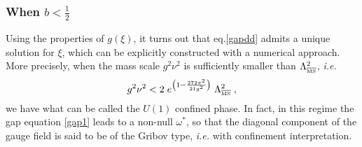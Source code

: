 \subsubsection{When $b<\frac{1}{2}$}
Using the properties of $g(\xi)$, it turns out that eq.\eqref{gapdd} admits a unique solution for $\xi$, which can be explicitly constructed with a numerical approach. More precisely, when the mass scale $g^2\nu^2$ is sufficiently smaller  than $\Lambda_{\overline{\mbox{\tiny{MS}}}}^2$, {\it i.e.}
\begin{equation}
g^2 \nu^2 < 2 \; e^{\left( 1 -\frac{272 \pi^2}{21 g^2} \right)} \; \Lambda_{\overline{\mbox{\tiny{MS}}}}^2   \;, \label{mh1}
\end{equation}
we have what can be called the $U(1)$ confined phase. In fact, in this regime the gap equation \eqref{gap1} leads to a non-null $\omega^*$, so that the diagonal component of the gauge field is said to be of the Gribov type, {\it i.e.} with confinement interpretation.

